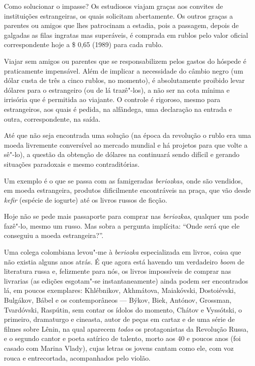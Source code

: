Como solucionar o impasse? Os estudiosos viajam graças aos convites de instituições estrangeiras, os quais solicitam abertamente. Os outros graças a parentes ou amigos que lhes patrocinam a estadia, pois a passagem, depois de galgadas as filas ingratas mas superáveis, é comprada em rublos pelo valor oficial correspondente hoje a \$ 0,65 (1989) para cada rublo.

Viajar sem amigos ou parentes que se responsabilizem pelos gastos do hóspede é praticamente impensável. Além de implicar a necessidade do câmbio negro (um dólar custa de três a cinco rublos, no momento), é absolutamente proibido levar dólares para o estrangeiro (ou de lá trazê"-los), a não ser na cota mínima e irrisória que é permitida ao viajante. O controle é rigoroso, mesmo para estrangeiros, aos quais é pedida, na alfândega, uma declaração na entrada e outra, correspondente, na saída.

Até que não seja encontrada uma solução (na época da revolução o rublo era uma moeda livremente conversível ao mercado mundial e há projetos para que volte a sê"-lo), a questão da obtenção de dólares na  continuará sendo difícil e gerando situações paradoxais e mesmo contraditórias.

Um exemplo é o que se passa com as famigeradas \emph{beriozkas}, onde são vendidos, em moeda estrangeira, produtos dificilmente encontráveis na praça, que vão desde \emph{kefir} (espécie de iogurte) até os livros russos de ficção.

Hoje não se pede mais passaporte para comprar nas \emph{beriozkas}, qualquer um pode fazê"-lo, mesmo um russo. Mas sobra a pergunta
implícita: ``Onde será que ele conseguiu a moeda estrangeira?''.

Uma colega colombiana levou"-me à \emph{beriozka} especializada em livros, coisa que não existia alguns anos atrás. É que agora está havendo um verdadeiro \emph{boom} de literatura russa e, felizmente para nós, os livros impossíveis de comprar nas livrarias (as edições esgotam"-se instantaneamente) ainda podem ser encontrados lá, em poucos exemplares: Khlébnikov, Akhmátova, Maiakóvski, Dostoiévski, Bulgákov, Bábel e os contemporâneos --- Býkov, Biek, Antónov, Grossman, Tvardóvski, Raspútin, sem contar os ídolos do momento, Chátov e Vyssótski, o primeiro, dramaturgo e cineasta, autor de peças em cartaz e de uma série de filmes sobre Lênin, na qual aparecem \emph{todos} os protagonistas da Revolução Russa, e o segundo cantor e poeta satírico de talento, morto aos 40 e poucos anos (foi casado com Marina Vlady), cujas letras os jovens cantam como ele, com voz rouca e entrecortada, acompanhados pelo violão.

